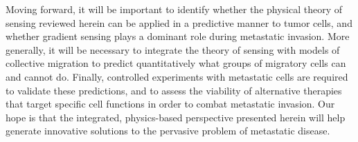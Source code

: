 Moving forward, it will be important to identify whether the physical theory of sensing reviewed herein can be applied in a predictive manner to tumor cells, and whether gradient sensing plays a dominant role during metastatic invasion. More generally, it will be necessary to integrate the theory of sensing with models of collective migration to predict quantitatively what groups of migratory cells can and cannot do. Finally, controlled experiments with metastatic cells are required to validate these predictions, and to assess the viability of alternative therapies that target specific cell functions in order to combat metastatic invasion. Our hope is that the integrated, physics-based perspective presented herein will help generate innovative solutions to the pervasive problem of metastatic disease.
